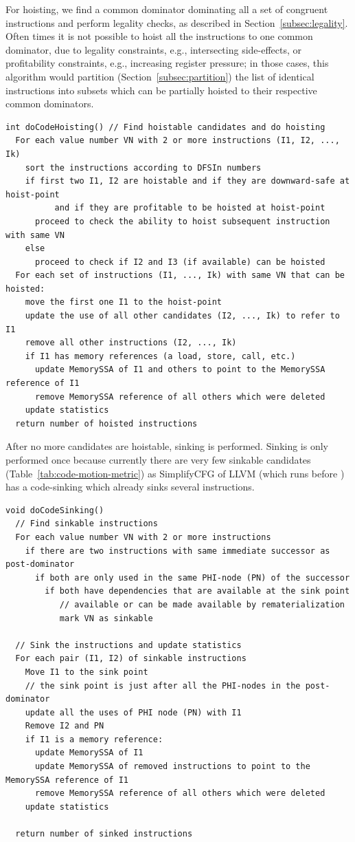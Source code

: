 \documentclass[acmlarge,review,anonymous]{acmart}\settopmatter{printfolios=true}
\begin{document}
For hoisting, we find a common dominator dominating all a set of congruent
instructions and perform legality checks, as described in
Section~\ref{subsec:legality}. Often times it is not possible to hoist all the
instructions to one common dominator, due to legality constraints, e.g.,
intersecting side-effects, or profitability constraints, e.g., increasing
register pressure; in those cases, this algorithm would partition
(Section~\ref{subsec:partition}) the list of identical instructions into subsets
which can be partially hoisted to their respective common dominators.
\newpage
\begin{verbatim}
int doCodeHoisting() // Find hoistable candidates and do hoisting
  For each value number VN with 2 or more instructions (I1, I2, ..., Ik)
    sort the instructions according to DFSIn numbers
    if first two I1, I2 are hoistable and if they are downward-safe at hoist-point
          and if they are profitable to be hoisted at hoist-point
      proceed to check the ability to hoist subsequent instruction with same VN
    else
      proceed to check if I2 and I3 (if available) can be hoisted
  For each set of instructions (I1, ..., Ik) with same VN that can be hoisted:
    move the first one I1 to the hoist-point
    update the use of all other candidates (I2, ..., Ik) to refer to I1
    remove all other instructions (I2, ..., Ik)
    if I1 has memory references (a load, store, call, etc.)
      update MemorySSA of I1 and others to point to the MemorySSA reference of I1
      remove MemorySSA reference of all others which were deleted
    update statistics
  return number of hoisted instructions
\end{verbatim}

After no more candidates are hoistable, sinking is performed. Sinking is only
performed once because currently there are very few sinkable candidates
(Table~\ref{tab:code-motion-metric}) as SimplifyCFG of LLVM (which runs before
\GCM{}) has a code-sinking which already sinks several instructions.

\begin{verbatim}
void doCodeSinking()
  // Find sinkable instructions
  For each value number VN with 2 or more instructions
    if there are two instructions with same immediate successor as post-dominator
      if both are only used in the same PHI-node (PN) of the successor
        if both have dependencies that are available at the sink point
           // available or can be made available by rematerialization
           mark VN as sinkable

  // Sink the instructions and update statistics
  For each pair (I1, I2) of sinkable instructions
    Move I1 to the sink point
    // the sink point is just after all the PHI-nodes in the post-dominator
    update all the uses of PHI node (PN) with I1
    Remove I2 and PN
    if I1 is a memory reference:
      update MemorySSA of I1
      update MemorySSA of removed instructions to point to the MemorySSA reference of I1
      remove MemorySSA reference of all others which were deleted
    update statistics

  return number of sinked instructions
\end{verbatim}
\end{document}
